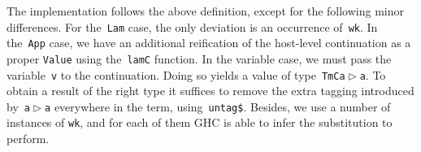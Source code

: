 \documentclass[9pt,preprint,authoryear]{sigplanconf}
\begin{document}
%
The implementation follows the above definition, except for the
    following minor differences. For the{~}\textcolor[rgb]{0.70,0.13,0.13}{\texttt{Lam}} case, the only
    deviation is an occurrence of{~}\textcolor[rgb]{0,0,0.80}{\texttt{wk}}. In the{~}\textcolor[rgb]{0.70,0.13,0.13}{\texttt{App}} case, we
    have an additional reification of the host-level continuation as a
    proper \textcolor[rgb]{0,0,0.80}{\texttt{Value}} using the{~}\textcolor[rgb]{0,0,0.80}{\texttt{lamC}} function.
    In the variable case, we must pass the variable{~}\textcolor[rgb]{0,0,0.80}{\texttt{v}} to the
    continuation. Doing so yields a value of type{~}\textcolor[rgb]{0,0,0.80}{\texttt{TmC}}\textcolor[rgb]{0,0,0.80}{\texttt{\mbox{\hspace{0.50em}}}}\textcolor[cmyk]{0,0.65,0.99,0}{\texttt{\makebox[1.22ex][l]{$ {(} $}}}\textcolor[rgb]{0,0,0.80}{\texttt{a}}\textcolor[rgb]{0,0,0.80}{\texttt{\mbox{\hspace{0.50em}}}}\textcolor[rgb]{0,0,0.80}{\texttt{$ \vartriangleright $}}\textcolor[rgb]{0,0,0.80}{\texttt{\mbox{\hspace{0.50em}}}}\textcolor[rgb]{0,0,0.80}{\texttt{a}}\textcolor[cmyk]{0,0.65,0.99,0}{\texttt{\makebox[1.22ex][r]{$ {)} $}}}.
    To obtain a result of the right type it suffices to remove the
    extra tagging introduced by{~}\textcolor[rgb]{0,0,0.80}{\texttt{a}}\textcolor[rgb]{0,0,0.80}{\texttt{\mbox{\hspace{0.50em}}}}\textcolor[rgb]{0,0,0.80}{\texttt{$ \vartriangleright $}}\textcolor[rgb]{0,0,0.80}{\texttt{\mbox{\hspace{0.50em}}}}\textcolor[rgb]{0,0,0.80}{\texttt{a}} everywhere in the term,
    using{~}\textcolor[cmyk]{0,0.65,0.99,0}{\texttt{\makebox[1.22ex][l]{$ {(} $}}}\textcolor[rgb]{0,0,0.80}{\texttt{untag}}\textcolor[rgb]{0,0,0.80}{\texttt{\mbox{\hspace{0.50em}}}}\textcolor[rgb]{0,0,0.80}{\texttt{\makebox[1.22ex][c]{\textless{}}\${}\makebox[1.22ex][c]{\textgreater{}}}}\textcolor[cmyk]{0,0.65,0.99,0}{\texttt{\makebox[1.22ex][r]{$ {)} $}}}. Besides, we use a number of instances of \textcolor[rgb]{0,0,0.80}{\texttt{wk}}, 
    and for each of them
    GHC is able to infer the substitution to perform.%


{\nopagebreak }
\end{document}
